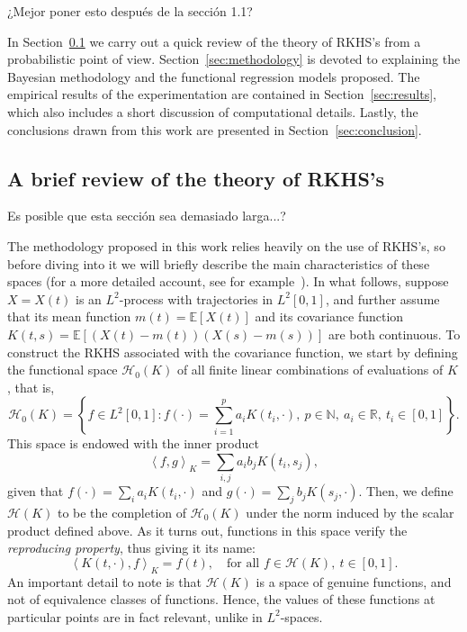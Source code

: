 \documentclass[ba]{imsart}
\numberwithin{equation}{section}
\theoremstyle{plain}
\newcommand{\N}{\mathbb{N}}
\newcommand{\R}{\mathbb{R}}
\newcommand\dotprod[2]{\left\langle #1, #2 \right\rangle}
\newenvironment{comment}
{
\noindent \em \color{red}
}
{
\color{black}
}
\begin{document}
\begin{comment}
¿Mejor poner esto después de la sección 1.1?
\end{comment}

In Section~\ref{sec:rkhs} we carry out a quick review of the theory of RKHS's from a probabilistic point of view. Section~\ref{sec:methodology} is devoted to explaining the Bayesian methodology and the functional regression models proposed. The empirical results of the experimentation are contained in Section~\ref{sec:results}, which also includes a short discussion of computational details. Lastly, the conclusions drawn from this work are presented in Section~\ref{sec:conclusion}.

\subsection{A brief review of the theory of RKHS's}\label{sec:rkhs}

\begin{comment}
  Es posible que esta sección sea demasiado larga...?
\end{comment}

The methodology proposed in this work relies heavily on the use of RKHS's, so before diving into it we will briefly describe the main characteristics of these spaces (for a more detailed account, see for example~\citet{berlinet2004reproducing}). In what follows, suppose \(X=X(t)\) is an \(L^2\)-process with trajectories in \(L^2[0,1]\), and further assume that its mean function \(m(t)=\mathbb E[X(t)]\) and its covariance function \(K(t, s)= \mathbb E[(X(t) - m(t))(X(s) - m(s))]\) are both continuous. To construct the RKHS associated with the covariance function, we start by defining the functional space \(\mathcal H_0(K)\) of all finite linear combinations of evaluations of \(K\), that is,
\[
\mathcal H_0(K) = \left\{ f \in L^2[0,1]: f(\cdot) = \sum_{i=1}^p a_i K(t_i, \cdot), \ p \in \N, \ a_i \in \R, \ t_i \in [0, 1] \right\}.
\]
This space is endowed with the inner product
\[
\dotprod{f}{g}_K = \sum_{i, j} a_i b_j K(t_i, s_j),
\]
given that \(f(\cdot)=\sum_i a_i K(t_i, \cdot) \) and \(g(\cdot)=\sum_j b_j K(s_j, \cdot)\). Then, we define \(\mathcal H(K)\) to be the completion of \(\mathcal H_0(K)\) under the norm induced by the scalar product defined above. As it turns out, functions in this space verify the \textit{reproducing property}, thus giving it its name:
\begin{equation}\label{eq:reproducing-property}
  \dotprod{K(t, \cdot)}{f}_K = f(t), \quad \text{for all } f \in \mathcal H(K), \ t \in [0, 1].
\end{equation}
An important detail to note is that \(\mathcal H(K)\) is a space of genuine functions, and not of equivalence classes of functions. Hence, the values of these functions at particular points are in fact relevant, unlike in \(L^2\)-spaces.
\end{document}
